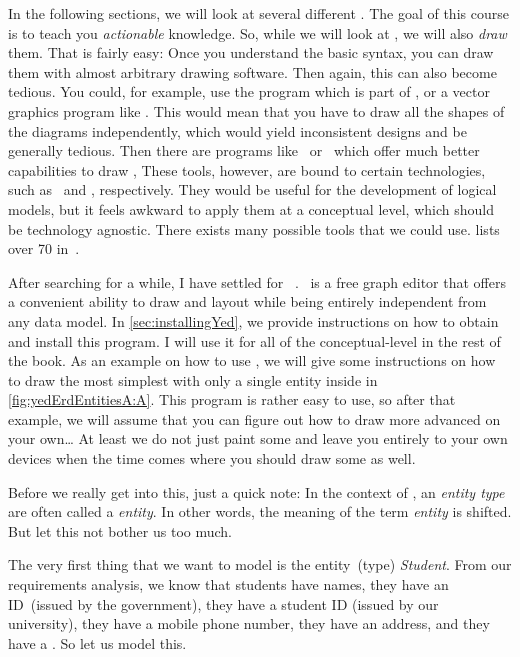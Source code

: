 In the following sections, we will look at several different .
The goal of this course is to teach you \emph{actionable} knowledge.
So, while we will look at , we will also \emph{draw} them.
That is fairly easy:
Once you understand the basic syntax, you can draw them with almost arbitrary drawing software.
Then again, this can also become tedious.
You could, for example, use the  program which is part of \libreoffice, or a vector graphics program like \inkscape.
This would mean that you have to draw all the shapes of the diagrams independently, which would yield inconsistent designs and be generally tedious.
Then there are programs like \pgmodeler\ or \mysqlWorkbench\ which offer much better capabilities to draw ,
These tools, however, are bound to certain technologies, such as \postgresql\ and \mysql, respectively.
They would be useful for the development of logical models, but it feels awkward to apply them at a conceptual level, which should be technology agnostic.
There exists many possible tools that we could use.
 lists over 70 in~\cite{B2025DS:7DMTC}.

After searching for a while, I have settled for \yEd~\cite{SG2015MDAWY,Y2011YGEM}.
\yEd\ is a free graph editor that offers a convenient ability to draw and layout  while being entirely independent from any data model.
In \cref{sec:installingYed}, we provide instructions on how to obtain and install this program.
I will use it for all of the conceptual-level  in the rest of the book.
As an example on how to use \yEd, we will give some instructions on how to draw the most simplest  with only a single entity inside in \cref{fig:yedErdEntitiesA:A}.
This program is rather easy to use, so after that example, we will assume that you can figure out how to draw more advanced  on your own\dots
At least we do not just paint some  and leave you entirely to your own devices when the time comes where you should draw some as well.

Before we really get into this, just a quick note:
In the context of , an \emph{entity type} are often called a \emph{entity}.
In other words, the meaning of the term \emph{entity} is shifted.
But let this not bother us too much.

The very first thing that we want to model is the entity~(type) \emph{Student}.
From our requirements analysis, we know that students have names, they have an ID~(issued by the government), they have a student ID (issued by our university), they have a mobile phone number, they have an address, and they have a .
So let us model this.

